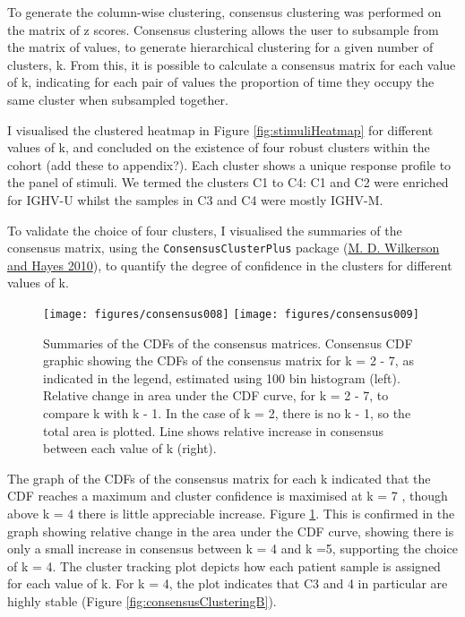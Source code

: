 \documentclass[11pt, a4paper, twosided]{book}
\begin{document}
To generate the column-wise clustering, consensus clustering was performed on the matrix of z scores. Consensus clustering allows the user to subsample from the matrix of values, to generate hierarchical clustering for a given number of clusters, k. From this, it is possible to calculate a consensus matrix for each value of k, indicating for each pair of values the proportion of time they occupy the same cluster when subsampled together.

I visualised the clustered heatmap in Figure \ref{fig:stimuliHeatmap} for different values of k, and concluded on the existence of four robust clusters within the cohort (add these to appendix?). Each cluster shows a unique response profile to the panel of stimuli. We termed the clusters C1 to C4: C1 and C2 were enriched for IGHV-U whilst the samples in C3 and C4 were mostly IGHV-M.

To validate the choice of four clusters, I visualised the summaries of the consensus matrix, using the \texttt{ConsensusClusterPlus} package (\protect\hyperlink{ref-ConsensusClusterPlus}{M. D. Wilkerson and Hayes 2010}), to quantify the degree of confidence in the clusters for different values of k.


\begin{figure}

{\centering \texttt{[image: figures/consensus008]} \texttt{[image: figures/consensus009]} 

}

\caption{Summaries of the CDFs of the consensus matrices. Consensus CDF graphic showing the CDFs of the consensus matrix for k = 2 - 7, as indicated in the legend, estimated using 100 bin histogram (left). Relative change in area under the CDF curve, for k = 2 - 7, to compare k with k - 1. In the case of k = 2, there is no k - 1, so the total area is plotted. Line shows relative increase in consensus between each value of k (right).}\label{fig:consensusClusteringA}
\end{figure}
The graph of the CDFs of the consensus matrix for each k indicated that the CDF reaches a maximum and cluster confidence is maximised at k = 7 , though above k = 4 there is little appreciable increase. Figure \ref{fig:consensusClusteringA}. This is confirmed in the graph showing relative change in the area under the CDF curve, showing there is only a small increase in consensus between k = 4 and k =5, supporting the choice of k = 4. The cluster tracking plot depicts how each patient sample is assigned for each value of k. For k = 4, the plot indicates that C3 and 4 in particular are highly stable (Figure \ref{fig:consensusClusteringB}).
\end{document}
